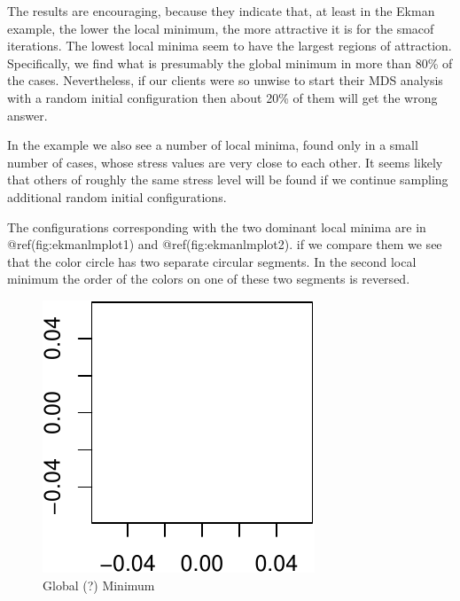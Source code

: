 \documentclass[
  12pt,
  letterpaper,
  DIV=11,
  numbers=noendperiod]{scrreprt}
\theoremstyle{remark}
\begin{document}
The results are encouraging, because they indicate that, at least in the
Ekman example, the lower the local minimum, the more attractive it is
for the smacof iterations. The lowest local minima seem to have the
largest regions of attraction. Specifically, we find what is presumably
the global minimum in more than 80\% of the cases. Nevertheless, if our
clients were so unwise to start their MDS analysis with a random initial
configuration then about 20\% of them will get the wrong answer.

In the example we also see a number of local minima, found only in a
small number of cases, whose stress values are very close to each other.
It seems likely that others of roughly the same stress level will be
found if we continue sampling additional random initial configurations.

The configurations corresponding with the two dominant local minima are
in @ref(fig:ekmanlmplot1) and @ref(fig:ekmanlmplot2). if we compare them
we see that the color circle has two separate circular segments. In the
second local minimum the order of the colors on one of these two
segments is reversed.

\begin{figure}[H]

{\centering \includegraphics{global_files/figure-pdf/ekmanlmplot1-1.pdf}

}

\caption{Global (?) Minimum}

\end{figure}%
\end{document}
